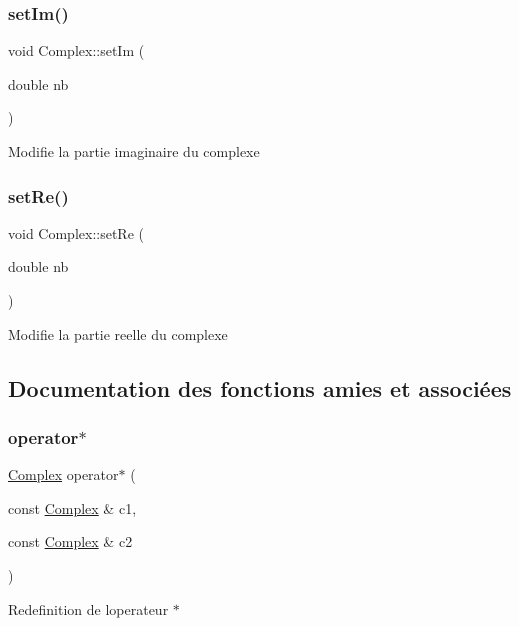 \subsubsection{\texorpdfstring{set\+Im()}{setIm()}}
{\footnotesize\ttfamily void Complex\+::set\+Im (\begin{DoxyParamCaption}\item[{double}]{nb }\end{DoxyParamCaption})}

Modifie la partie imaginaire du complexe \mbox{\label{classComplex_abb500a2eaeb93c489fbc38506fdd0750}} 
\subsubsection{\texorpdfstring{set\+Re()}{setRe()}}
{\footnotesize\ttfamily void Complex\+::set\+Re (\begin{DoxyParamCaption}\item[{double}]{nb }\end{DoxyParamCaption})}

Modifie la partie reelle du complexe 

\subsection{Documentation des fonctions amies et associées}
\mbox{\label{classComplex_aadf4af6aafa8eea50ea802bce62c954c}} 
\subsubsection{\texorpdfstring{operator$\ast$}{operator*}}
{\footnotesize\ttfamily \hyperlink{classComplex}{Complex} operator$\ast$ (\begin{DoxyParamCaption}\item[{const \hyperlink{classComplex}{Complex} \&}]{c1,  }\item[{const \hyperlink{classComplex}{Complex} \&}]{c2 }\end{DoxyParamCaption})\hspace{0.3cm}{\ttfamily [friend]}}

Redefinition de l\textquotesingle{}operateur $\ast$ \mbox{\label{classComplex_a3946e00b31192f0b4628357b86131044}} 
